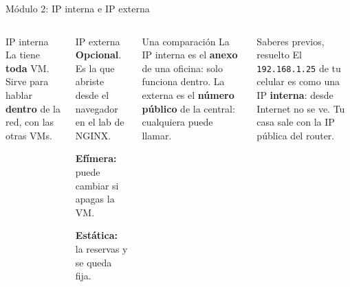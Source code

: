 \documentclass[aspectratio=169,10pt,c]{beamer}
\begin{document}
\begin{frame}{Módulo 2: IP interna e IP externa}
\begin{columns}[T,onlytextwidth]
\begin{block}{IP interna}
\small La tiene \textbf{toda} VM. Sirve para hablar \textbf{dentro} de la red, con las otras VMs.
\end{block}
\begin{block}{IP externa}
\small \textbf{Opcional}. Es la que abriste desde el navegador en el lab de NGINX.\par\smallskip
\textbf{Efímera:} puede cambiar si apagas la VM.\par
\textbf{Estática:} la reservas y se queda fija.
\end{block}
\begin{exampleblock}{Una comparación}
\small La IP interna es el \textbf{anexo} de una oficina: solo funciona dentro. La externa es el \textbf{número público} de la central: cualquiera puede llamar.
\end{exampleblock}
\begin{alertblock}{Saberes previos, resuelto}
\small El \texttt{192.168.1.25} de tu celular es como una IP \textbf{interna}: desde Internet no se ve. Tu casa sale con la IP pública del router.
\end{alertblock}
\end{columns}
\end{frame}
\end{document}

